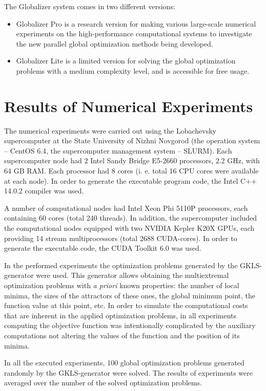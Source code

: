 \documentclass{aims}
\theoremstyle{definition}
\begin{document}
\par
The Globalizer system comes in two different versions:
\begin{itemize}
  \item Globalizer Pro is a research version for making various large-scale numerical experiments on the high-performance computational systems to investigate the new parallel global optimization methods being developed.
  \item Globalizer Lite is a limited version for solving the global optimization problems with a medium complexity level, and is accessible for free usage.
\end{itemize}

\section{Results of Numerical Experiments}
\label{sec:experiments}
The numerical experiments were carried out using the Lobachevsky supercomputer at
the State University of Nizhni Novgorod (the operation system – CentOS 6.4, the
supercomputer management system – SLURM). Each supercomputer node had 2 Intel Sandy Bridge
E5-2660 processors, 2.2 GHz, with 64 GB RAM. Each processor had 8 cores (i. e. total
16 CPU cores were available at each node). In order to generate the executable program code, the Intel C++ 14.0.2 compiler was used.
\par
A number of computational nodes had Intel Xeon Phi 5110P processors, each containing 60 cores
(total 240 threads). In addition, the supercomputer included the computational nodes equipped
with two NVIDIA Kepler K20X GPUs, each providing 14 stream multiprocessors (total 2688 CUDA-cores). In order to generate the executable code, the CUDA Toolkit 6.0 was used.
\par
In the performed experiments the optimization problems generated by the GKLS-generator
\cite{gavianoKvasovLeraSergeev2003} were used. This generator allows obtaining the multiextremal optimization
problems with \textit{a priori} known properties: the number of local minima, the sizes of the attractors of these ones, the global minimum point, the function value at this point, etc. In order to simulate the computational costs that are inherent in the applied optimization problems, in all experiments computing the objective function was intentionally complicated by the auxiliary computations not altering the values of the function and the position of its minima.
\par
In all the executed experiments, 100 global optimization problems generated randomly by the GKLS-generator were solved. The results of experiments were averaged over the number of the solved optimization problems.
\end{document}
